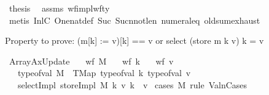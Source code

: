 \begin{isabellebody}
\ {\isacharquery}{\kern0pt}thesis\ \isamarkupfalse%
\ assms{\isacharparenleft}{\kern0pt}{}{\isacharparenright}{\kern0pt}\ wf{\isacharunderscore}{\kern0pt}impl{\isacharunderscore}{\kern0pt}wf{\isacharunderscore}{\kern0pt}ty\isanewline
\ \ \ \ \isamarkupfalse%
\ {\isacharparenleft}{\kern0pt}metis\ InlC{}\ One{\isacharunderscore}{\kern0pt}nat{\isacharunderscore}{\kern0pt}def\ Suc{\isacharunderscore}{\kern0pt}{}\ Suc{\isacharunderscore}{\kern0pt}n{\isacharunderscore}{\kern0pt}not{\isacharunderscore}{\kern0pt}le{\isacharunderscore}{\kern0pt}n\ numeral{\isacharunderscore}{\kern0pt}{}{\isacharunderscore}{\kern0pt}eq{\isacharunderscore}{\kern0pt}{}\ old{\isachardot}{\kern0pt}sum{\isachardot}{\kern0pt}exhaust{\isacharparenright}{\kern0pt}\isanewline
{}\isamarkupfalse%
%
\endisatagproof
{\isafoldproof}%
%
\isadelimproof
%
\endisadelimproof
%
\isadelimdocument
%
\endisadelimdocument
%
\isatagdocument
%
\isamarkuptrue%
%
\endisatagdocument
{\isafolddocument}%
%
\isadelimdocument
%
\endisadelimdocument
%
\begin{isamarkuptext}%
Property to prove: (m[k] := v)[k] == v or select (store m k v) k = v%
\end{isamarkuptext}\isamarkuptrue%
\isamarkupfalse%
\ ArrayAxUpdate{\isacharcolon}{\kern0pt}\isanewline
\ \ \ {\isachardoublequoteopen}wf\ M{\isachardoublequoteclose}\isanewline
\ \ \ {\isachardoublequoteopen}wf\ k{\isachardoublequoteclose}\isanewline
\ \ \ {\isachardoublequoteopen}wf\ v{\isachardoublequoteclose}\isanewline
\ \ \ {\isachardoublequoteopen}type{\isacharunderscore}{\kern0pt}of{\isacharunderscore}{\kern0pt}val\ M\ {\isacharequal}{\kern0pt}\ TMap\ {\isacharparenleft}{\kern0pt}type{\isacharunderscore}{\kern0pt}of{\isacharunderscore}{\kern0pt}val\ k{\isacharparenright}{\kern0pt}\ {\isacharparenleft}{\kern0pt}type{\isacharunderscore}{\kern0pt}of{\isacharunderscore}{\kern0pt}val\ v{\isacharparenright}{\kern0pt}{\isachardoublequoteclose}\isanewline
\ \ \ {\isachardoublequoteopen}selectImpl\ {\isacharparenleft}{\kern0pt}storeImpl\ M\ k\ v{\isacharparenright}{\kern0pt}\ k\ {\isacharequal}{\kern0pt}\ v{\isachardoublequoteclose}\isanewline
%
\isadelimproof
%
\endisadelimproof
%
\isatagproof
{}\isamarkupfalse%
\ {\isacharparenleft}{\kern0pt}cases\ M\ rule{\isacharcolon}{\kern0pt}\ ValnCases{\isacharparenright}{\kern0pt}\isanewline

\end{isabellebody}
